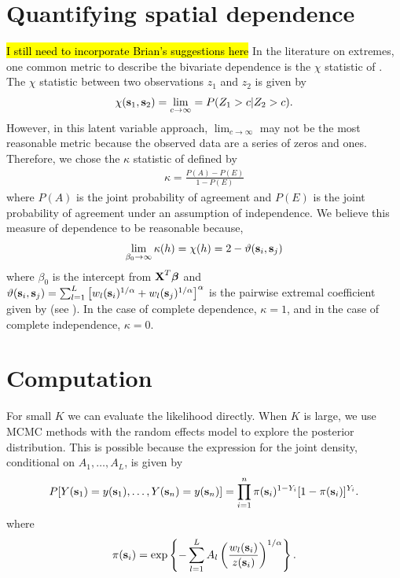 \documentclass[11pt]{article}
\begin{document}
\section{Quantifying spatial dependence}
\hl{I still need to incorporate Brian's suggestions here}
In the literature on extremes, one common metric to describe the bivariate dependence is the $\chi$ statistic of \citet{Coles1999}.
The $\chi$ statistic between two observations $z_1$ and $z_2$ is given by
\begin{align}
  \chi(\mbox{\bf s}_1, \mbox{\bf s}_2) = \lim_{c \rightarrow \infty} = P(Z_1 > c | Z_2 > c).
\end{align}
However, in this latent variable approach, $\lim_{c \rightarrow \infty}$ may not be the most reasonable metric because the observed data are a series of zeros and ones.
Therefore, we chose the $\kappa$ statistic of \citet{Cohen1960} defined by
\begin{align}
  \kappa = \frac{P(A) - P(E)}{1 - P(E)}
\end{align}
where $P(A)$ is the joint probability of agreement and $P(E)$ is the joint probability of agreement under an assumption of independence.
We believe this measure of dependence to be reasonable because,
\begin{align}
  \lim_{\beta_0 \rightarrow \infty} \kappa(h) = \chi(h) = 2 - \vartheta(\mbox{\bf s}_i, \mbox{\bf s}_j)
\end{align}
where $\beta_0$ is the intercept from $\mbox{\bf X}^T\mbox{\boldmath $\beta$}$ and $\vartheta (\mbox{\bf s}_i, \mbox{\bf s}_j) = \sum_{ l = 1 }^{ L } \left[ w_{l}(\mbox{\bf s}_i)^{ 1/\alpha } +  w_{ l}(\mbox{\bf s}_j)^{ 1/\alpha } \right]^\alpha$ is the pairwise extremal coefficient given by \citet{Reich2012} (see ).
In the case of complete dependence, $\kappa = 1$, and in the case of complete independence, $\kappa = 0$.

\section{Computation}\label{rbs:comp}
For small $K$ we can evaluate the likelihood directly.
When $K$ is large, we use MCMC methods with the random effects model to explore the posterior distribution.
This is possible because the expression for the joint density, conditional on $A_1, \ldots, A_L$, is given by
\begin{align}
	P[Y(\mbox{\bf s}_1)=y(\mbox{\bf s}_1),\ldots,Y(\mbox{\bf s}_n)=y(\mbox{\bf s}_n)] = \prod_{ i = 1 }^{ n } \pi(\mbox{\bf s}_i)^{ 1 - Y_i } [1 - \pi(\mbox{\bf s}_i)]^{ Y_i }.
\end{align}
where
\begin{align}
  \pi(\mbox{\bf s}_i) = \exp \left\{ -\sum_{ l = 1 }^{L} A_l \left( \frac{ w_{l}(\mbox{\bf s}_i) }{ z(\mbox{\bf s}_i) } \right)^{ 1/\alpha} \right\}.
\end{align}
\end{document}
